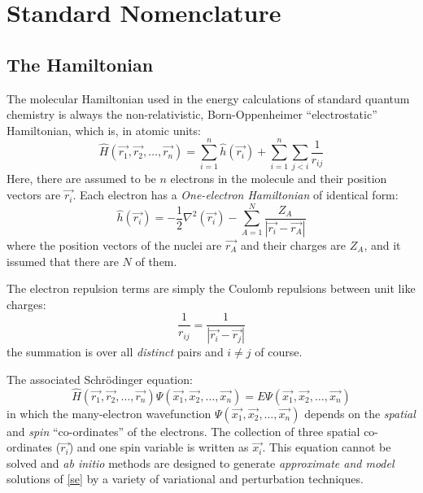 \chapter{\sf Standard Nomenclature}
\label{app1a}
\section{\sf The Hamiltonian}
The molecular Hamiltonian used in the energy calculations
of standard quantum chemistry is always the non-relativistic, Born-Oppenheimer
``electrostatic'' Hamiltonian, which is, in
atomic units:
\begin{equation}
\hat{H} ( \vec{r_1}, \vec{r_2}, \ldots , \vec{r_n} ) = 
\sum_{i=1}^{n} { \hat{h} (\vec{r_i}) } + 
\sum_{i=1}^{n} { \sum_{j < i} { \frac{1}{ r_{ij} } } }
\label{H}
\end{equation}
Here, there are assumed to be $n$ electrons in the molecule and their
position vectors are $\vec{r_i}$.
Each electron has a {\em One-electron Hamiltonian} of identical
form:
\begin{equation}
\hat{h} (\vec{r_i}) = - \frac{1}{2} \nabla^2 (\vec{r_i})
- \sum_{A=1}^{N} { \frac{Z_A}{ | \vec{r_i} - \vec{r_A} | } }
\label{h}
\end{equation}
where the position vectors of the nuclei are $\vec{r_A}$ and their
charges are $Z_A$, and it issumed that there are $N$ of them.

The electron repulsion terms are simply the Coulomb repulsions
between unit like charges:
\[
\frac{1}{r_{ij}} = \frac{1}{ | \vec{r_i} - \vec{r_j} | }
\]
the summation is over all {\em distinct} pairs and $i \not= j$ of course.

The associated Schr\"{o}dinger equation:
\begin{equation}
\hat{H} ( \vec{r_1}, \vec{r_2}, \ldots , \vec{r_n} ) 
\Psi ( \vec{x_1}, \vec{x_2}, \ldots , \vec{x_n} ) = E 
\Psi ( \vec{x_1}, \vec{x_2}, \ldots , \vec{x_n} ) 
\label{se}
\end{equation}
in which the many-electron wavefunction 
$\Psi ( \vec{x_1}, \vec{x_2}, \ldots , \vec{x_n} )$ depends on the
{\em spatial} and {\em spin} ``co-ordinates'' of the electrons.
The collection of three spatial co-ordinates ($\vec{r_i}$) and one
spin variable is written as $\vec{x_i}$. 
This equation cannot be solved and {\em ab initio} methods are designed 
to generate {\em approximate
and model} solutions of \ref{se} by a variety of variational and
perturbation techniques.
